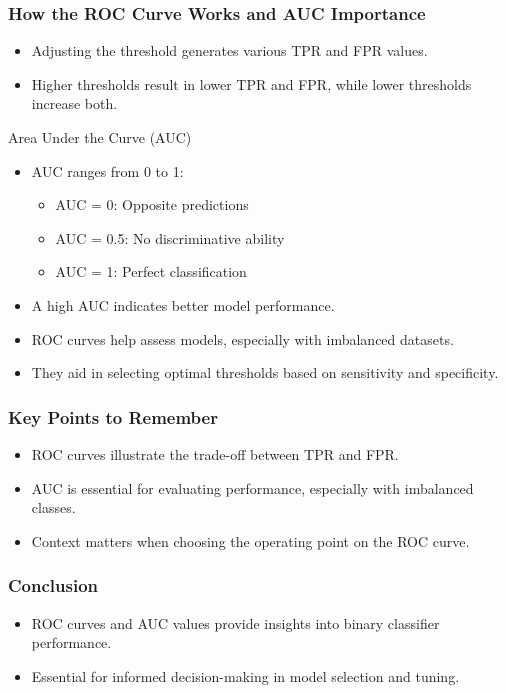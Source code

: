 \documentclass[aspectratio=169]{beamer}
\begin{document}
\begin{frame}[fragile]
    \frametitle{How the ROC Curve Works and AUC Importance}
    \begin{itemize}
        \item Adjusting the threshold generates various TPR and FPR values.
        \item Higher thresholds result in lower TPR and FPR, while lower thresholds increase both.
    \end{itemize}
    \begin{block}{Area Under the Curve (AUC)}
        \begin{itemize}
            \item AUC ranges from 0 to 1:
            \begin{itemize}
                \item AUC = 0: Opposite predictions
                \item AUC = 0.5: No discriminative ability
                \item AUC = 1: Perfect classification
            \end{itemize}
            \item A high AUC indicates better model performance.
        \end{itemize}
    \end{block}
    \begin{itemize}
        \item ROC curves help assess models, especially with imbalanced datasets.
        \item They aid in selecting optimal thresholds based on sensitivity and specificity.
    \end{itemize}
\end{frame}

\begin{frame}[fragile]
    \frametitle{Key Points to Remember}
    \begin{itemize}
        \item ROC curves illustrate the trade-off between TPR and FPR.
        \item AUC is essential for evaluating performance, especially with imbalanced classes.
        \item Context matters when choosing the operating point on the ROC curve.
    \end{itemize}
\end{frame}

\begin{frame}[fragile]
    \frametitle{Conclusion}
    \begin{itemize}
        \item ROC curves and AUC values provide insights into binary classifier performance.
        \item Essential for informed decision-making in model selection and tuning.
    \end{itemize}
\end{frame}
\end{document}
